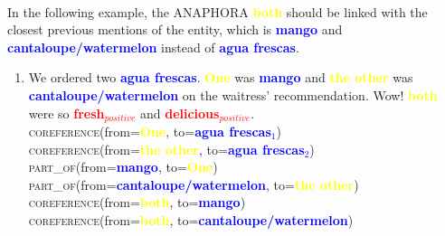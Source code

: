 \documentclass{article}
\begin{document}
\paragraph{}
In the following example, the ANAPHORA \textbf{\textcolor{yellow}{both}} should be linked with the closest previous mentions of the entity, which is \textbf{\textcolor{blue}{mango}} and \textbf{\textcolor{blue}{cantaloupe/watermelon}} instead of \textbf{\textcolor{blue}{agua frescas}}.

\begin{enumerate}[resume]
\item We ordered two \textbf{\textcolor{blue}{agua frescas}}. \textbf{\textcolor{yellow}{One}} was  \textbf{\textcolor{blue}{mango}} and \textbf{\textcolor{yellow}{the other}} was 
\textbf{\textcolor{blue}{cantaloupe/watermelon}} on the waitress' recommendation. Wow! 
\textbf{\textcolor{yellow}{both}} were so 
\textbf{\textcolor{red}{fresh$_{positive}$}} and 
\textbf{\textcolor{red}{delicious$_{positive}$}}.\\
\textsc{coreference}(from=\textbf{\textcolor{yellow}{One}}, to=\textbf{\textcolor{blue}{agua frescas$_{1}$}}) \\
\textsc{coreference}(from=\textbf{\textcolor{yellow}{the other}}, to=\textbf{\textcolor{blue}{agua frescas$_{2}$}}) \\
\textsc{part\_of}(from=\textbf{\textcolor{blue}{mango}}, to=\textbf{\textcolor{yellow}{One}})\\
\textsc{part\_of}(from=\textbf{\textcolor{blue}{cantaloupe/watermelon}}, to=\textbf{\textcolor{yellow}{the other}})\\
\textsc{coreference}(from=\textbf{\textcolor{yellow}{both}}, to=\textbf{\textcolor{blue}{mango}}) \\
\textsc{coreference}(from=\textbf{\textcolor{yellow}{both}}, to=\textbf{\textcolor{blue}{cantaloupe/watermelon}}) \\
\end{enumerate}
\end{document}
